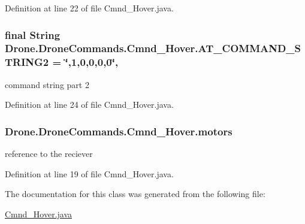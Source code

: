Definition at line 22 of file Cmnd\+\_\+\+Hover.\+java.

\hypertarget{class_drone_1_1_drone_commands_1_1_cmnd___hover_a617bce0e87944c82c0a1199d405d5301}{}
\subsubsection[{A\+T\+\_\+\+C\+O\+M\+M\+A\+N\+D\+\_\+\+S\+T\+R\+I\+N\+G2}]{\setlength{\rightskip}{0pt plus 5cm}final String Drone.\+Drone\+Commands.\+Cmnd\+\_\+\+Hover.\+A\+T\+\_\+\+C\+O\+M\+M\+A\+N\+D\+\_\+\+S\+T\+R\+I\+N\+G2 = \char`\"{},1,0,0,0,0\char`\"{}\hspace{0.3cm}{\ttfamily [static]}, {\ttfamily [private]}}\label{class_drone_1_1_drone_commands_1_1_cmnd___hover_a617bce0e87944c82c0a1199d405d5301}
command string part 2 

Definition at line 24 of file Cmnd\+\_\+\+Hover.\+java.

\hypertarget{class_drone_1_1_drone_commands_1_1_cmnd___hover_ac1a7b5271784b61c9f20d811fcdac401}{}
\subsubsection[{motors}]{ Drone.\+Drone\+Commands.\+Cmnd\+\_\+\+Hover.\+motors\hspace{0.3cm}{\ttfamily [private]}}\label{class_drone_1_1_drone_commands_1_1_cmnd___hover_ac1a7b5271784b61c9f20d811fcdac401}
reference to the reciever 

Definition at line 19 of file Cmnd\+\_\+\+Hover.\+java.



The documentation for this class was generated from the following file\+:\begin{DoxyCompactItemize}
\item 
\hyperlink{_cmnd___hover_8java}{Cmnd\+\_\+\+Hover.\+java}\end{DoxyCompactItemize}
